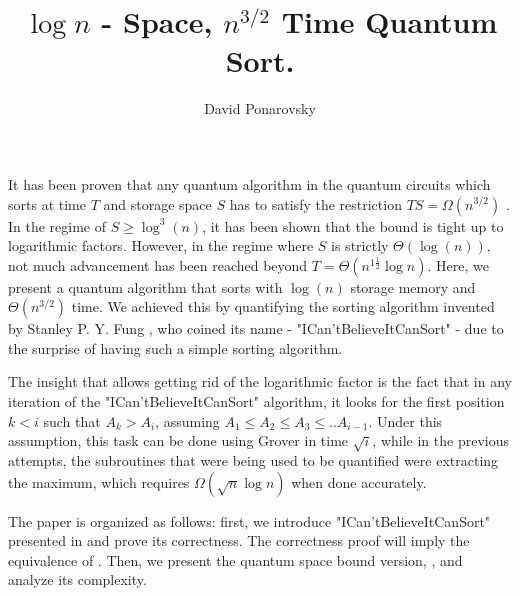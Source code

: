 \documentclass[manuscript,screen,review]{acmart}
\begin{document}


\title{$\log n$ - Space, $n^{3/2}$ Time Quantum Sort.} 
\author{David Ponarovsky}
\maketitle

It has been proven that any quantum algorithm in the quantum circuits which sorts at time $T$ and storage space $S$ has to satisfy the restriction $TS = \Omega(n^{3/2})$ \cite{klauck2003quantum}. In the regime of $S \ge \log^{3}(n)$, it has been shown that the bound is tight up to logarithmic factors. However, in the regime where $S$ is strictly $\Theta(\log(n))$, not much advancement has been reached beyond $T = \Theta( n^{1 \frac{1}{2}} \log n )$. Here, we present a quantum algorithm that sorts with $\log(n)$ storage memory and $ \Theta(n^{3/2})$ time. We achieved this by quantifying the sorting algorithm invented by Stanley P. Y. Fung \cite{Simplesort}, who coined its name - "ICan'tBelieveItCanSort" - due to the surprise of having such a simple sorting algorithm.

The insight that allows getting rid of the logarithmic factor is the fact that in any iteration of the "ICan'tBelieveItCanSort" algorithm, it looks for the first position $k < i$ such that $A_{k} > A_{i}$, assuming $A_{1}\le A_{2} \le A_{3} \le .. A_{i-1}$. Under this assumption, this task can be done using Grover in time $\sqrt{i}$, while in the previous attempts, the subroutines that were being used to be quantified were extracting the maximum, which requires $\Omega(\sqrt{n} \log n)$ when done accurately. 

The paper is organized as follows: first, we introduce "ICan'tBelieveItCanSort" presented in  and prove its correctness. The correctness proof will imply the equivalence of . Then, we present the quantum space bound version, , and analyze its complexity.
\end{document}

